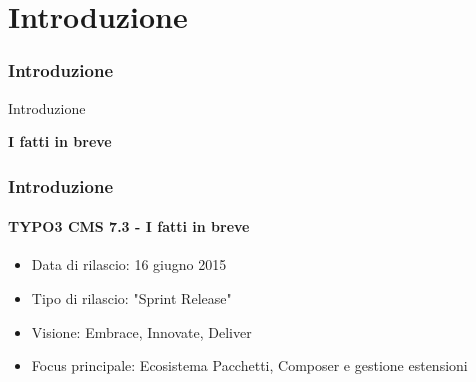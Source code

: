 %

\section{Introduzione}
\begin{frame}[fragile]
	\frametitle{Introduzione}

	\begin{center}\huge{Introduzione}\end{center}
	\begin{center}\huge{\color{typo3darkgrey}\textbf{I fatti in breve}}\end{center}

\end{frame}

\begin{frame}[fragile]
	\frametitle{Introduzione}
	\framesubtitle{TYPO3 CMS 7.3 - I fatti in breve}

	\begin{itemize}
		\item Data di rilascio: 16 giugno 2015
		\item Tipo di rilascio: "Sprint Release"
		\item Visione: Embrace, Innovate, Deliver
		\item Focus principale: Ecosistema Pacchetti, Composer e gestione estensioni
	\end{itemize}

\end{frame}

